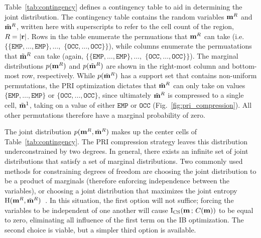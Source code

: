 Table~\ref{tab:contingency} defines a contingency table to aid in determining
the joint distribution. The contingency table contains the random variables
$\mathbf{m}^{R}$ and $\tilde{\mathbf{m}}^{R}$, written here with superscripts to refer to
the cell count of the region, $R=\vert\mathbf{r}\vert$. Rows in the table enumerate the
permuations that $\mathbf{m}^{R}$ can take (i.e.
$\{\{\texttt{EMP},\dots,\texttt{EMP}\}$$,\dots,$
$\{\texttt{OCC},\dots,\texttt{OCC}\}\}$), while columns enumerate the
permuatations that $\tilde{\mathbf{m}}^{R}$ can take (again,
$\{\{\texttt{EMP},\dots,\texttt{EMP}\}$$,\dots,$
$\{\texttt{OCC},\dots,\texttt{OCC}\}\}$). The marginal distributions
$p(\mathbf{m}^{R})$ and $p(\tilde{\mathbf{m}}^{R})$ are shown in the right-most column
and bottom-most row, respectively. While $p(\tilde{\mathbf{m}}^{R})$ has a support
set that contains non-uniform permutations, the PRI optimization dictates that
$\tilde{\mathbf{m}}^{R}$ can only take on values
$\{\texttt{EMP},\dots,\texttt{EMP}\}$ or $\{\texttt{OCC},\dots,\texttt{OCC}\}$,
since ultimately $\tilde{\mathbf{m}}^{R}$ is compressed to a single cell,
$\tilde{\mathbf{m}}^{1}$, taking on a value of either
$\texttt{EMP}$ or $\texttt{OCC}$
(Fig.~\ref{fig:pri_compression}).
All other permutations therefore have a marginal probability of zero.



The joint distribution $p(\mathbf{m}^{R},
\tilde{\mathbf{m}}^{R})$ makes up the center cells of Table~\ref{tab:contingency}.
The PRI compression strategy leaves this distribution underconstrained
by two degrees. In general, there exists an infinite set of joint distributions that satisfy
a set of marginal distributions. Two commonly used methods for constraining degrees of
freedom are choosing the joint distribution to be a product of marginals (therefore
enforcing independence between the variables), or choosing a joint distribution that
maximizes the joint entropy $\text{H}(\mathbf{m}^{R}, \tilde{\mathbf{m}}^{R})$~\cite{abbas2006entropy}.
In this situation, the first option will not suffice; forcing the variables to be independent of
one another will cause $\text{I}_{\text{CS}}(\mathbf{m}\,;\,C(\mathbf{m}))$ to be
equal to zero, eliminating all influence of the first term on the IB
optimization. The second choice is viable, but a simpler third option is
available.

